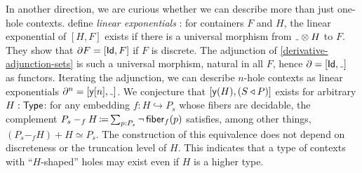 In another direction, we are curious whether we can describe more than just one-hole contexts.
 define \emph{linear exponentials} \cite[{Def.~4.1}]{AbbottEtAl2003DerivativesContainers}:
for containers \( F \) and \( H \), the linear exponential of \( [H, F] \) exists if there is a universal morphism from \( \Blank \CTimes H \) to \( F \).
They show that \( \partial{F} = [\mathsf{Id}, F] \) if \( F \) is discrete.
The adjunction of \autoref{derivative-adjunction-sets} is such a universal morphism, natural in all \( F \),
hence \( \Der = [\Id, \Blank] \) as functors.
Iterating the adjunction, we can describe \( n \)-hole contexts as linear exponentials \( \Der^n = [\CYo\Fin{n}, \Blank] \).
We conjecture that \( [\mathsf{y}(H), (S\mathbin{\triangleleft}P)] \) exists for arbitrary \( H : \operatorname{\mathsf{Type}} \):
for any embedding \( f : H \hookrightarrow P_s \) whose fibers are decidable,
the complement \( P_s -_f H \operatorname{\mathrel{\coloneq}} \sum_{p : P_s} \neg \operatorname{\mathsf{fiber}}_f(p) \) satisfies, among other things, \( (P_s -_f H) + H \simeq P_s \).
The construction of this equivalence does not depend on discreteness or the truncation level of \( H \).
This indicates that a type of contexts with \enquote{\( H \)-shaped} holes may exist even if \( H \) is a higher type.
